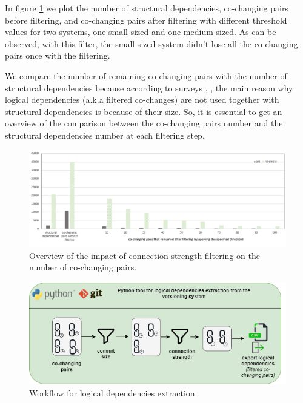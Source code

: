 \documentclass[runningheads]{comsis2}
\begin{document}
In figure \ref{fig:strength_overview} we plot the number of structural dependencies, co-changing pairs before filtering, and co-changing pairs after filtering with different threshold values for two systems, one small-sized and one medium-sized. As can be observed, with this filter, the small-sized system didn't lose all the co-changing pairs once with the filtering. 

We compare the number of remaining co-changing pairs with the number of structural dependencies because according to surveys \cite{Shtern:2012:CMS:2332427.2332428}, \cite{sar}, the main reason why logical dependencies (a.k.a filtered co-changes) are not used together with structural dependencies is because of their size. So, it is essential to get an overview of the comparison between the co-changing pairs number and the structural dependencies number at each filtering step.

\begin{figure}
\centering
\includegraphics[width=\textwidth]{strength_overview.PNG}
\caption{Overview of the impact of connection strength filtering on the number of co-changing pairs. }
\label{fig:strength_overview}
\centering
\end{figure}


\begin{figure}
\centering
\includegraphics[width=\textwidth]{ld_workflow.png}
\caption{Workflow for logical dependencies extraction.}
\label{fig:workflow_key}
\centering
\end{figure}
\end{document}
